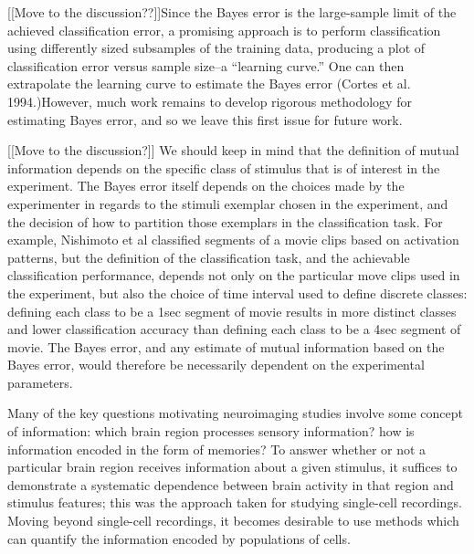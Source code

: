 \documentclass[12pt]{article}
\begin{document}
[[Move to the discussion??]]Since the Bayes error is the large-sample
limit of the achieved classification error, a promising approach is to
perform classification using differently sized subsamples of the
training data, producing a plot of classification error versus sample
size--a ``learning curve.'' One can then extrapolate the learning
curve to estimate the Bayes error (Cortes et al. 1994.)However, much
work remains to develop rigorous methodology for estimating Bayes
error, and so we leave this first issue for future work.

[[Move to the discussion?]] We should keep in mind that the definition
of mutual information depends on the specific class of stimulus that
is of interest in the experiment.  The Bayes error itself depends on
the choices made by the experimenter in regards to the stimuli
exemplar chosen in the experiment, and the decision of how to
partition those exemplars in the classification task.  For example,
Nishimoto et al classified segments of a movie clips based on
activation patterns, but the definition of the classification task,
and the achievable classification performance, depends not only on the
particular move clips used in the experiment, but also the choice of
time interval used to define discrete classes: defining each class to
be a 1sec segment of movie results in more distinct classes and lower
classification accuracy than defining each class to be a 4sec segment
of movie. The Bayes error, and any estimate of mutual information
based on the Bayes error, would therefore be necessarily dependent on
the experimental parameters.


Many of the key questions motivating neuroimaging studies involve some
concept of information: which brain region processes sensory
information?  how is information encoded in the form of memories?  To
answer whether or not a particular brain region receives information
about a given stimulus, it suffices to demonstrate a systematic
dependence between brain activity in that region and stimulus
features; this was the approach taken for studying single-cell
recordings.  Moving beyond single-cell recordings, it becomes
desirable to use methods which can quantify the information encoded by
populations of cells.
\end{document}
